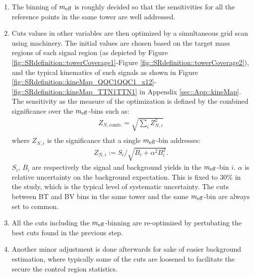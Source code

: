 \begin{enumerate}
\item The binning of $m_{\mathrm{eff}}$ is roughly decided so that the sensitivities for all the reference points in the same tower are well addressed.
\item Cuts values in other variables are then optimized by a simultaneous grid scan using machinery. The initial values are chosen based on the target mass regions of each signal region (as depicted by Figure \ref{fig::SRdefinition::towerCoverage1}-Figure \ref{fig::SRdefinition::towerCoverage2}), and the typical kinematics of such signals as shown in Figure \ref{fig::SRdefinition::kineMap_QQC1QQC1_x12}-\ref{fig::SRdefinition::kineMap_TTN1TTN1} in Appendix \ref{sec::App::kineMap}.
The sensitivity as the measure of the optimization is defined by the combined significance over the $m_{\mathrm{eff}}$-bins such as:
\begin{align}
Z_{N,\mathrm{comb.}} =\sqrt{\sum_i Z_{N,i}^2}  \label{ZNcomb} \\
\end{align}
where $Z_{N,i}$ is the significance that a single $m_{\mathrm{eff}}$-bin addresses:
\begin{align}
Z_{N,i} := S_i/\sqrt{B_i+\alpha^2 B_i^2}. \label{eq::ZNdef}
\end{align}
$S_i$, $B_i$ are respectively the signal and background yields in the $m_{\mathrm{eff}}$-bin $i$. 
$\alpha$ is relative uncertainty on the background expectation. This is fixed to $30\%$ in the study, which is the typical level of systematic uncertainty. 
The cuts between BT and BV bins in the same tower and the same $m_{\mathrm{eff}}$-bin are always set to common.

\item All the cuts including the $m_{\mathrm{eff}}$-binning are re-optimized by pertubating the best cuts found in the previous step.


\item Another minor adjustment is done afterwards for sake of easier background estimation, where typically some of the cuts are loosened to facilitate the secure the control region statistics.
\end{enumerate}

